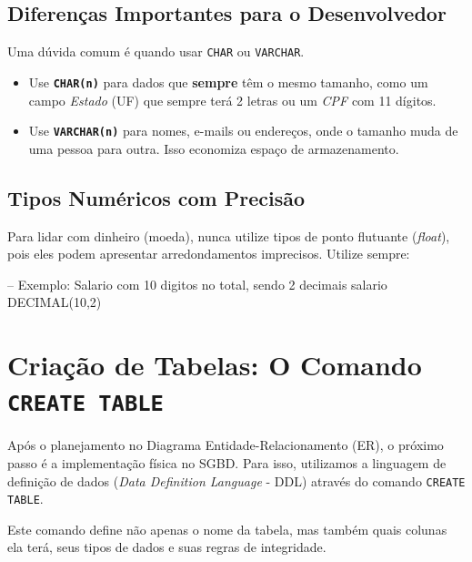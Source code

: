 \subsection{Diferenças Importantes para o Desenvolvedor}

\begin{tcolorbox}[colback=blue!5,colframe=blue!40!black,title=Dica do Professor: CHAR vs VARCHAR]
Uma dúvida comum é quando usar \texttt{CHAR} ou \texttt{VARCHAR}. 
\begin{itemize}
    \item Use \textbf{\texttt{CHAR(n)}} para dados que \textbf{sempre} têm o mesmo tamanho, como um campo \textit{Estado} (UF) que sempre terá 2 letras ou um \textit{CPF} com 11 dígitos.
    \item Use \textbf{\texttt{VARCHAR(n)}} para nomes, e-mails ou endereços, onde o tamanho muda de uma pessoa para outra. Isso economiza espaço de armazenamento.
\end{itemize}
\end{tcolorbox}



\subsection{Tipos Numéricos com Precisão}

Para lidar com dinheiro (moeda), nunca utilize tipos de ponto flutuante (\textit{float}), pois eles podem apresentar arredondamentos imprecisos. Utilize sempre:

\begin{sqlcode}
-- Exemplo: Salario com 10 digitos no total, sendo 2 decimais
salario DECIMAL(10,2)
\end{sqlcode}

\vspace{0.5cm}
 
\section{Criação de Tabelas: O Comando \texttt{CREATE TABLE}}

Após o planejamento no Diagrama Entidade-Relacionamento (ER), o próximo passo é a implementação física no SGBD. Para isso, utilizamos a linguagem de definição de dados (\textit{Data Definition Language} - DDL) através do comando \texttt{CREATE TABLE}.

Este comando define não apenas o nome da tabela, mas também quais colunas ela terá, seus tipos de dados e suas regras de integridade.

